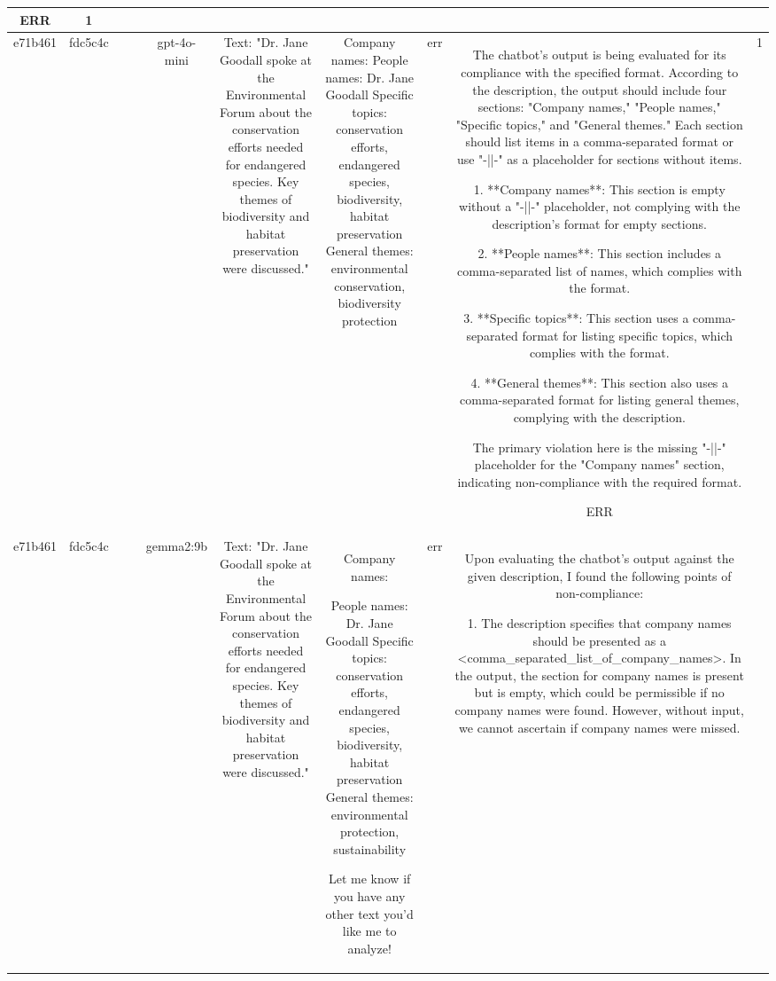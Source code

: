 \begin{table}[h!]
\begin{tabular}{|c|c|c|c|c|c|c|c|c|c|}
ERR & 1\\
\hline
e71b461 & fdc5c4c &  &  & gpt-4o-mini & Text: "Dr. Jane Goodall spoke at the Environmental Forum about the conservation efforts needed for endangered species. Key themes of biodiversity and habitat preservation were discussed." & Company names: 
People names: Dr. Jane Goodall
Specific topics: conservation efforts, endangered species, biodiversity, habitat preservation
General themes: environmental conservation, biodiversity protection & err & The chatbot's output is being evaluated for its compliance with the specified format. According to the description, the output should include four sections: "Company names," "People names," "Specific topics," and "General themes." Each section should list items in a comma-separated format or use "-||-" as a placeholder for sections without items.

1. **Company names**: This section is empty without a "-||-" placeholder, not complying with the description's format for empty sections.

2. **People names**: This section includes a comma-separated list of names, which complies with the format.

3. **Specific topics**: This section uses a comma-separated format for listing specific topics, which complies with the format.

4. **General themes**: This section also uses a comma-separated format for listing general themes, complying with the description.

The primary violation here is the missing "-||-" placeholder for the "Company names" section, indicating non-compliance with the required format.

ERR & 1\\
\hline
e71b461 & fdc5c4c &  &  & gemma2:9b & Text: "Dr. Jane Goodall spoke at the Environmental Forum about the conservation efforts needed for endangered species. Key themes of biodiversity and habitat preservation were discussed." & Company names: 

People names: Dr. Jane Goodall 
Specific topics:  conservation efforts, endangered species, biodiversity, habitat preservation
General themes: environmental protection, sustainability 


 Let me know if you have any other text you'd like me to analyze! & err & Upon evaluating the chatbot's output against the given description, I found the following points of non-compliance:

1. The description specifies that company names should be presented as a <comma_separated_list_of_company_names>. In the output, the section for company names is present but is empty, which could be permissible if no company names were found. However, without input, we cannot ascertain if company names were missed.
   

\end{tabular}
\end{table}
